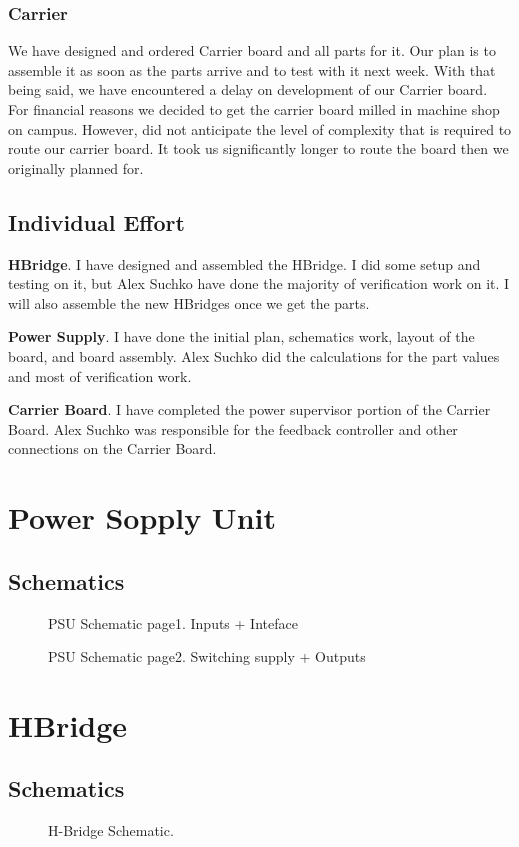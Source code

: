 \documentclass[12pt]{article}
\newcommand{\figuremine}[2]{
\begin{figure}[H]
\noindent\makebox[\textwidth]{
 \texttt{[image: \#1]}}
 \caption{#2}
\end{figure}
}
\begin{document}
\subsubsection{Carrier}
We have designed and ordered Carrier board and all parts for it. Our plan is to assemble it as soon as the parts arrive and to test with it next week. With that being said, we have encountered a delay on development of our Carrier board. For financial reasons we decided to get the carrier board milled in machine shop on campus. However, did not anticipate the level of complexity that is required to route our carrier board. It took us significantly longer to route the board then we originally planned for.
\subsection{Individual Effort}
 \begin{description}
  \item{\bf HBridge}. I have designed and assembled the HBridge. I did some setup and testing on it, but Alex Suchko have done the majority of verification work on it. I will also assemble the new HBridges once we get the parts. 
  \item{\bf Power Supply}. I  have done the initial plan, schematics work, layout of the board, and board assembly. Alex Suchko did the calculations for the part values and most of verification work. 
  \item{\bf Carrier Board}. I have completed the power supervisor portion of the Carrier Board. Alex Suchko was responsible for the feedback controller and other connections on the Carrier Board.
\end{description}


\newpage
\section{Power Sopply Unit}
\subsection{Schematics}
\figuremine{~/ece445/Chalk-Bot/Hardware/Power_board/page1.png}{PSU Schematic page1. Inputs + Inteface}
\figuremine{~/ece445/Chalk-Bot/Hardware/Power_board/page2.png}{PSU Schematic page2. Switching supply + Outputs}
\newpage
\section{HBridge}
\subsection{Schematics}
\figuremine{~/ece445/Chalk-Bot/Hardware/H_Bridge/page1.png}{H-Bridge Schematic.}
\end{document}

